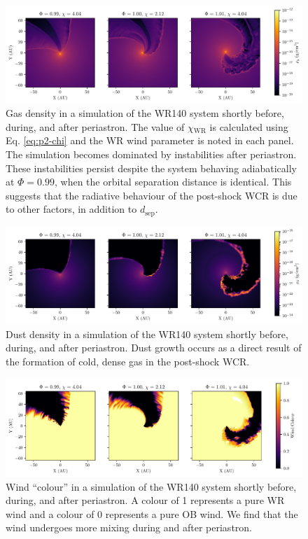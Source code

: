 \documentclass[fleqn,usenatbib]{mnras}
\newcommand{\rms}[1]{\ensuremath{_{\text{#1}}}}
\begin{document}
\begin{figure}
  \centering
  \includegraphics[width=0.95\linewidth]{assets/periastron-3-rho.pdf}
  \caption[Gas density in a simulation of the WR140 system]{Gas density in a simulation of the WR140 system shortly before, during, and after periastron. The value of $\chi\rms{WR}$ is calculated using Eq. \ref{eq:p2-chi} and the WR wind parameter is noted in each panel. The simulation becomes dominated by instabilities after periastron. These instabilities persist despite the system behaving adiabatically at $\Phi = 0.99$, when the  orbital separation distance is identical. This suggests that the radiative behaviour of the post-shock WCR is due to other factors, in addition to $d\rms{sep}$.}
  \label{fig:p2-fullpage-rho}
\end{figure}

\begin{figure}
  \centering
  \includegraphics[width=0.95\linewidth]{assets/periastron-3-rhod.pdf}
  \caption[Dust density in a simulation of the WR140 system]{Dust density in a simulation of the WR140 system shortly before, during, and after periastron. Dust growth occurs as a direct result of the formation of cold, dense gas in the post-shock WCR.}
  \label{fig:p2-fullpage-rhod}
\end{figure}

\begin{figure}
  \centering
  \includegraphics[width=0.95\linewidth]{assets/periastron-3-r0.pdf}
  \caption[Wind ``colour'' in a simulation of the WR140 system]{Wind ``colour'' in a simulation of the WR140 system shortly before, during, and after periastron. A colour of 1 represents a pure WR wind and a colour of 0 represents a pure OB wind. We find that the wind undergoes more mixing during and after periastron.}
  \label{fig:p2-fullpage-r0}
\end{figure}
\end{document}
